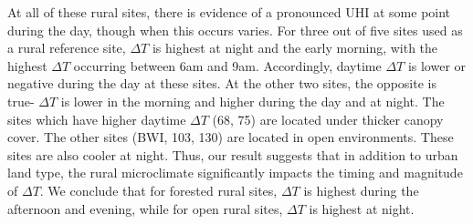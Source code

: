 \documentclass[draft,linenumbers]{agujournal}
\begin{document}
At all of these rural sites, there is evidence of a pronounced UHI at some point during the day, though when this occurs varies.
 For three out of five sites used as a rural reference site, $\Delta T$ is highest at night and the early morning, with the highest $\Delta T$ occurring between 6am and
9am.  
Accordingly, daytime $\Delta T$ is lower or negative during the day at these sites. 
At the other two sites, the opposite is true- $\Delta T$ is lower in the morning and higher during the day and at night. 
The sites which have higher daytime $\Delta T$ (68, 75) are located under thicker canopy cover. The other sites (BWI, 103, 130) are located in open environments. These sites are also cooler at night. 
Thus, our result suggests that in addition to urban land type, the rural microclimate significantly impacts the timing and magnitude of $ \Delta T$. We conclude that for forested rural sites, $\Delta T$ is highest during the afternoon and evening, while for open rural sites, $\Delta T$ is highest at night. 

%

\end{document}
